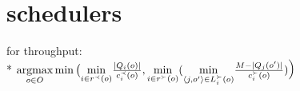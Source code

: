 \section{schedulers}\label{sec:schedulers}
for throughput:\\*
$
\underset{o\in O}{\operatorname{argmax}}
	\min 
    \big(	
		  \underset{i \in r^\prec(o)} {\min}
			  \frac {\left| Q_i (o) \right|} {c^\prec_i(o)},
		  \underset{i \in r^\succ(o)} {\min}	
			\large( 
        \underset{\langle j, o'\rangle \in L^\succ_i(o)} {\min} 
				\frac {M - | Q_j (o') |}{c^\succ_i(o)}
			\large)
		\big)
$
